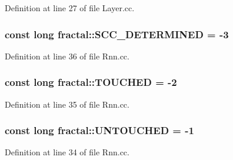 Definition at line 27 of file Layer.\+cc.

\hypertarget{namespacefractal_a3287683802bb03d81549392013a9c759}{
\subsubsection[{S\+C\+C\+\_\+\+D\+E\+T\+E\+R\+M\+I\+N\+E\+D}]{\setlength{\rightskip}{0pt plus 5cm}const long fractal\+::\+S\+C\+C\+\_\+\+D\+E\+T\+E\+R\+M\+I\+N\+E\+D = -\/3\hspace{0.3cm}{\ttfamily [static]}}}\label{namespacefractal_a3287683802bb03d81549392013a9c759}


Definition at line 36 of file Rnn.\+cc.

\hypertarget{namespacefractal_affbd8e698e8d877464a1ac3be5d2a758}{
\subsubsection[{T\+O\+U\+C\+H\+E\+D}]{\setlength{\rightskip}{0pt plus 5cm}const long fractal\+::\+T\+O\+U\+C\+H\+E\+D = -\/2\hspace{0.3cm}{\ttfamily [static]}}}\label{namespacefractal_affbd8e698e8d877464a1ac3be5d2a758}


Definition at line 35 of file Rnn.\+cc.

\hypertarget{namespacefractal_a4a8aba0e06362fc4539e2bd952ca11b5}{
\subsubsection[{U\+N\+T\+O\+U\+C\+H\+E\+D}]{\setlength{\rightskip}{0pt plus 5cm}const long fractal\+::\+U\+N\+T\+O\+U\+C\+H\+E\+D = -\/1\hspace{0.3cm}{\ttfamily [static]}}}\label{namespacefractal_a4a8aba0e06362fc4539e2bd952ca11b5}


Definition at line 34 of file Rnn.\+cc.

